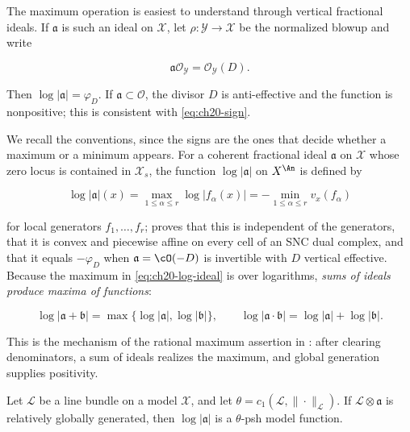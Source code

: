 The maximum operation is easiest to understand through vertical fractional
ideals.  If $\mathfrak a$ is such an ideal on $\mathcal X$, let
$\rho:\mathcal Y\to\mathcal X$ be the normalized blowup and write

\begin{equation}
\label{eq:ch20-ideal-divisor}
             \mathfrak a\mathcal O_{\mathcal Y}
                    =\mathcal O_{\mathcal Y}(D).
\end{equation}

Then $\log|\mathfrak a|=\varphi_D$.  If $\mathfrak a\subset\mathcal O$,
the divisor $D$ is anti-effective and the function is nonpositive; this is
consistent with \eqref{eq:ch20-sign}.

We recall the conventions, since the signs are the ones that decide whether
a maximum or a minimum appears.  For a coherent fractional ideal
$\mathfrak a$ on $\mathcal X$ whose zero locus is contained in
$\mathcal X_s$, the function $\log|\mathfrak a|$ on $X^{\An}$ is
defined by

\begin{equation}
\label{eq:ch20-log-ideal}
 \log|\mathfrak a|(x)=\max_{1\le\alpha\le r}\log|f_\alpha(x)|
 =-\min_{1\le\alpha\le r}v_x(f_\alpha)
\end{equation}

for local generators $f_1,\dots,f_r$; 
proves that this is independent of the generators, that it is convex and
piecewise affine on every cell of an SNC dual complex, and that it equals
$-\varphi_D$ when $\mathfrak a=\cO(-D)$ is invertible with $D$
vertical effective.  Because the maximum in \eqref{eq:ch20-log-ideal} is
over logarithms, \emph{sums of ideals produce maxima of functions}:

\begin{equation}
\label{eq:ch20-ideal-sum-max}
 \log|\mathfrak a+\mathfrak b|
 =\max\{\log|\mathfrak a|,\log|\mathfrak b|\},
 \qquad
 \log|\mathfrak a\cdot\mathfrak b|
 =\log|\mathfrak a|+\log|\mathfrak b| .
\end{equation}

This is the mechanism of the rational maximum assertion in
: after clearing denominators, a sum of ideals
realizes the maximum, and global generation supplies positivity.

\begin{lemma}\label{lem:ch20-generated-ideal-psh}
Let $\mathcal L$ be a line bundle on a model $\mathcal X$, and let
$\theta=c_1(\mathcal L,\|\cdot\|_{\mathcal L})$.  If
$\mathcal L\otimes\mathfrak a$ is relatively globally generated, then
$\log|\mathfrak a|$ is a $\theta$-psh model function.
\end{lemma}

